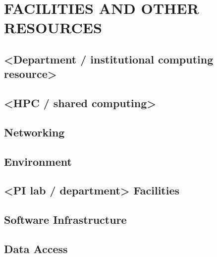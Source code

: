 \documentclass[11pt,letterpaper]{article}
\begin{document}
\section{FACILITIES AND OTHER RESOURCES}

\subsection{<Department / institutional computing resource>}

\subsection{<HPC / shared computing>}

\subsection{Networking}

\subsection{Environment}

\subsection{<PI lab / department> Facilities}

\subsection{Software Infrastructure}

\subsection{Data Access}
\end{document}
